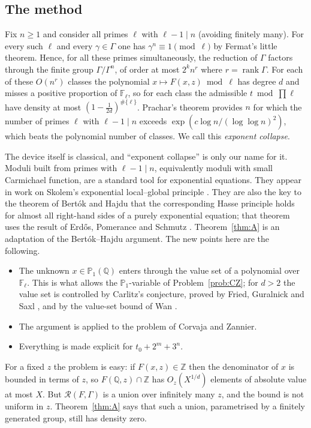 \documentclass[11pt]{amsart}
\theoremstyle{definition}
\theoremstyle{remark}
\newcommand{\Z}{\mathbb{Z}}
\newcommand{\Q}{\mathbb{Q}}
\newcommand{\F}{\mathbb{F}}
\newcommand{\PP}{\mathbb{P}}
\newcommand{\R}{\mathcal{R}}
\begin{document}
\subsection{The method}
Fix $n\ge1$ and consider all primes $\ell$ with $\ell-1\mid n$ (avoiding finitely many).
For every such $\ell$ and every $\gamma\in\Gamma$ one has $\gamma^n\equiv1\pmod\ell$ by Fermat's little theorem.
Hence, for all these primes simultaneously, the reduction of $\Gamma$ factors through the finite group $\Gamma/\Gamma^n$, of order at most $2^kn^{r}$ where $r=\operatorname{rank}\Gamma$.
For each of these $O(n^r)$ classes the polynomial $x\mapsto F(x,z)\bmod\ell$ has degree $d$ and misses a positive proportion of $\F_\ell$, so for each class the admissible $t\bmod\prod\ell$ have density at most $(1-\frac1{2d})^{\#\{\ell\}}$.
Prachar's theorem \cite{Pra55} provides $n$ for which the number of primes $\ell$ with $\ell-1\mid n$ exceeds $\exp(c\log n/(\log\log n)^2)$, which beats the polynomial number of classes.
We call this \emph{exponent collapse}.

The device itself is classical, and ``exponent collapse'' is only our name for it.
Moduli built from primes with $\ell-1\mid n$, equivalently moduli with small Carmichael function, are a standard tool for exponential equations.
They appear in work on Skolem's exponential local--global principle \cite{Sko37,BBL13}.
They are also the key to the theorem of Bert\'ok and Hajdu \cite{BH16,BH18} that the corresponding Hasse principle holds for almost all right-hand sides of a purely exponential equation; that theorem uses the result of Erd\H{o}s, Pomerance and Schmutz \cite{EPS91}.
Theorem~\ref{thm:A} is an adaptation of the Bert\'ok--Hajdu argument.
The new points here are the following.
\begin{itemize}
\item The unknown $x\in\PP_1(\Q)$ enters through the value set of a polynomial over $\F_\ell$. This is what allows the $\PP_1$-variable of Problem~\ref{prob:CZ}; for $d>2$ the value set is controlled by Carlitz's conjecture, proved by Fried, Guralnick and Saxl \cite{FGS93}, and by the value-set bound of Wan \cite{Wan93,WSC93}.
\item The argument is applied to the problem of Corvaja and Zannier.
\item Everything is made explicit for $t_0+2^m+3^n$.
\end{itemize}
For a fixed $z$ the problem is easy: if $F(x,z)\in\Z$ then the denominator of $x$ is bounded in terms of $z$, so $F(\Q,z)\cap\Z$ has $O_z(X^{1/d})$ elements of absolute value at most $X$.
But $\R(F,\Gamma)$ is a union over infinitely many $z$, and the bound is not uniform in $z$.
Theorem~\ref{thm:A} says that such a union, parametrised by a finitely generated group, still has density zero.
\end{document}
